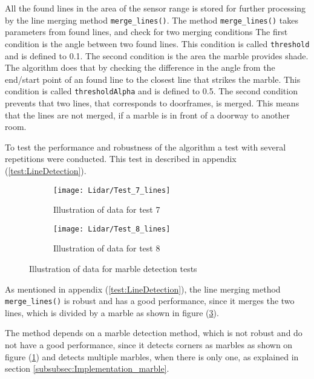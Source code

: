 \documentclass[../Head/Main.tex]{subfiles}
\begin{document}
All the found lines in the area of the sensor range is stored for further processing by the line merging method \texttt{merge\_lines()}.
The method \texttt{merge\_lines()} takes parameters from found lines, and check for two merging conditions The first condition is the angle between two found lines. This condition is called \texttt{threshold} and is defined to 0.1. The second condition is the area the marble provides shade. The algorithm does that by checking the difference in the angle from the end/start point of an found line to the closest line that strikes the marble. This condition is called \texttt{thresholdAlpha} and is defined to 0.5. The second condition prevents that two lines, that corresponds to doorframes, is merged. This means that the lines are not merged, if a marble is in front of a doorway to another room.\par
To test the performance and robustness of the algorithm a  test with several repetitions were conducted. This test in described in appendix (\ref{test:LineDetection}).
\begin{figure}[H]
  \begin{subfigure}[b]{0.5\textwidth}
  	\centering
    \texttt{[image: Lidar/Test\_7\_lines]}
    \caption{Illustration of data for test 7}
    \label{fig:LineTest7}
  \end{subfigure}
  \hfill
  \begin{subfigure}[b]{0.5\textwidth}
  	\centering
    \texttt{[image: Lidar/Test\_8\_lines]}
    \caption{Illustration of data for test 8}
    \label{fig:LineTest8}
  \end{subfigure}
  \caption{Illustration of data for marble detection tests}
\end{figure}
As mentioned in appendix (\ref{test:LineDetection}), the line merging method \texttt{merge\_lines()} is robust and has a good performance, since it merges the two lines, which is divided by a marble as shown in figure (\ref{fig:LineTest8}). \par
The method depends on a marble detection method, which is not robust and do not have a good performance, since it detects corners as marbles as shown on figure (\ref{fig:LineTest7}) and detects multiple marbles, when there is only one, as explained in section \ref{subsubsec:Implementation_marble}.
\end{document}
